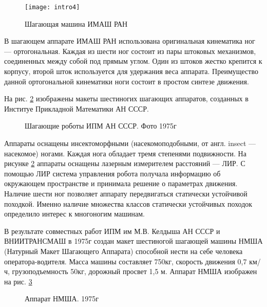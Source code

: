 \begin{figure}[h]
\centering
\texttt{[image: intro4]}
\caption{Шагающая машина ИМАШ РАН}
\label{img:imash_ran}
\end{figure}

В шагающем аппарате ИМАШ РАН использована оригинальная кинематика ног --- ортогональная. Каждая из шести ног состоит из пары штоковых механизмов, соединенных между собой под прямым углом. Один из штоков жестко крепится к корпусу, второй шток используется для удержания веса аппарата. Преимущество данной ортогональной кинематики ноги состоит в простом синтезе движения.

На рис. \ref{img:IPM_robots} изображены макеты шестиногих шагающих аппаратов, созданных в Институе Прикладной Математики АН СССР.

\begin{figure}[h]
  \begin{minipage}[h]{0.49\linewidth}
  \end{minipage}
  \hfill
  \begin{minipage}[h]{0.49\linewidth}
  \end{minipage}
  \caption{Шагающие роботы ИПМ АН СССР. Фото 1975г}
  \label{img:IPM_robots}  
\end{figure}

Аппараты оснащены инсектоморфными (насекомоподобными, от англ. insect --- насекомое) ногами. Каждая нога обладает тремя степенями подвижности. На рисунке \ref{img:IPM_robots} аппараты оснащены лазерным измерителем расстояний --- ЛИР. С помощью ЛИР система управления робота получала информацию об окружающем пространстве и принимала решение о параметрах движения. Наличие шести ног позволяет аппарату передвигаться статически устойчивой походкой. Именно наличие множества классов статически устойчивых походок определило интерес к многоногим машинам.

В результате совместных работ ИПМ им М.В. Келдыша АН СССР и ВНИИТРАНСМАШ в 1975г создан макет шестиногой шагающей машины НМША (Натурный Макет Шагающего Аппарата) способной нести на себе человека оператора-водителя. Масса машины составляет 750кг, скорость движения 0,7 км/ч, грузоподъемность 50кг, дорожный просвет 1,5 м. Аппарат НМША изображен на рис. \ref{img:NMSHA}

\begin{figure}[h]
  \begin{minipage}[h]{0.49\linewidth}
  \end{minipage}
  \hfill
  \begin{minipage}[h]{0.49\linewidth}
  \end{minipage}
  \caption{Аппарат НМША. 1975г}
  \label{img:NMSHA}  
\end{figure}

